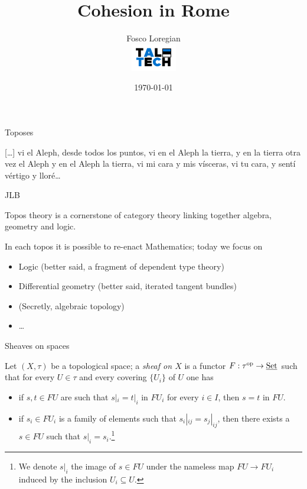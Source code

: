 \documentclass[presentation,handout]{beamer}
\author{Fosco Loregian \\[3pt] \includegraphics[scale=1.5]{logo.pdf}}
\date{\today}
\title{Cohesion in Rome}
\begin{document}
\maketitle
\begin{frame}{Toposes}
  \linespread{.66}
  \epigraph{
  \tiny [\dots\unkern] vi el Aleph, desde todos los puntos, vi en el Aleph la tierra, y en la tierra otra vez el Aleph y en el Aleph la tierra, vi mi cara y mis vísceras, vi tu cara, y sentí vértigo y lloré\dots
  }{JLB}
  \linespread{1}
  Topos theory is a cornerstone of category theory linking together algebra, geometry and logic.
  
  In each topos it is possible to re-enact Mathematics; today we focus on
  \begin{itemize}
    \item<3-> Logic (better said, a fragment of \alert{dependent type theory})
    \item<4-> Differential geometry (better said, iterated \alert{tangent bundles})
    \item<5-> (Secretly, algebraic topology)
    \item<6-> \dots
  \end{itemize}
\end{frame}
%
%
%
%
%
%
%
\begin{frame}{Sheaves on spaces}
  \begin{block}{}
    Let $(X,\tau)$ be a topological space; a \emph{sheaf on $X$} is a functor $F : \tau^{\text{op}}\to \underline{\text{Set}}$ such that for every $U\in\tau$ and every covering $\{U_i\}$ of $U$ one has
    \begin{itemize}
      \item<2-> if $s, t\in FU$ are such that $s|_i = t|_i$ in $FU_i$ for every $i\in I$, then $s=t$ in $FU$.
      \item<3-> if $s_i\in FU_i$ is a family of elements such that $s_i|_{ij} = s_j|_{ij}$, then there exists a $s\in FU$ such that $s|_i = s_i$.\footnote{We denote $s|_i$ the image of $s\in FU$ under the nameless map $FU\to FU_i$ induced by the inclusion $U_i\subseteq U$.}
    \end{itemize}
  \end{block}
\end{frame}
%
%
%
%
%
%
%
\end{document}

